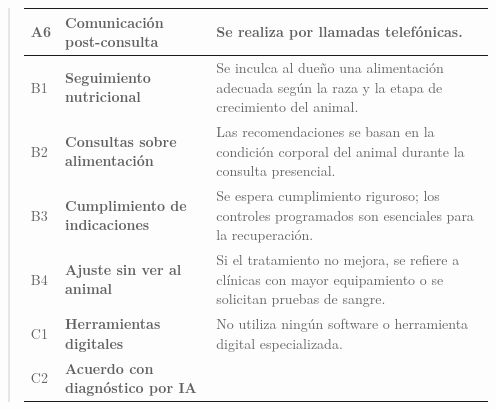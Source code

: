 \documentclass[
]{article}
\newcounter{none} %
\begin{document}
\begin{quote}
{\def\LTcaptype{none} %
\begin{longtable}[]{|
  >{\centering\arraybackslash}p{}|
  >{\raggedright\arraybackslash}p{}|
  >{\raggedright\arraybackslash}p{}|}
\hline
\begin{minipage}[b]{\linewidth}\centering
A6
\end{minipage} & \begin{minipage}[b]{\linewidth}\raggedright
\textbf{Comunicación post-consulta}
\end{minipage} & \begin{minipage}[b]{\linewidth}\raggedright
Se realiza por llamadas telefónicas.
\end{minipage} \\
\hline
\endhead
\hline
\endlastfoot
B1 & \textbf{Seguimiento nutricional} &
\begin{minipage}[t]{\linewidth}\raggedright
Se inculca al dueño una alimentación adecuada según la raza y la etapa
de crecimiento del animal.
\end{minipage} \\
\hline
B2 & \textbf{Consultas sobre alimentación} &
\begin{minipage}[t]{\linewidth}\raggedright
Las recomendaciones se basan en la condición corporal del animal durante
la consulta presencial.
\end{minipage} \\
\hline
B3 & \textbf{Cumplimiento de indicaciones} &
\begin{minipage}[t]{\linewidth}\raggedright
Se espera cumplimiento riguroso; los controles programados son
esenciales para la recuperación.
\end{minipage} \\
\hline
B4 & \textbf{Ajuste sin ver al animal} &
\begin{minipage}[t]{\linewidth}\raggedright
Si el tratamiento no mejora, se refiere a clínicas con mayor
equipamiento o se solicitan pruebas de sangre.
\end{minipage} \\
\hline
C1 & \textbf{Herramientas digitales} &
\begin{minipage}[t]{\linewidth}\raggedright
No utiliza ningún software o herramienta digital especializada.
\end{minipage} \\
\hline
C2 & \textbf{Acuerdo con diagnóstico por IA} &
\begin{minipage}[t]{\linewidth}\raggedright

\end{minipage}
\end{longtable}}
\end{quote}
\end{document}
